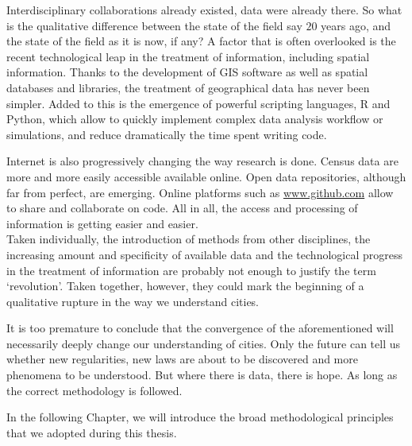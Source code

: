 Interdisciplinary collaborations already existed, data were already there. So
what is the qualitative difference between the state of the field say $20$ years
ago, and the state of the field as it is now, if any? A factor that is often
overlooked is the recent technological leap in the treatment of information,
including spatial information. Thanks to the development of GIS software as well
as spatial databases and libraries, the treatment of geographical data has never
been simpler. Added to this is the emergence of powerful scripting languages, R
and Python, which allow to quickly implement complex data analysis workflow or
simulations, and reduce dramatically the time spent writing code. 

Internet is also progressively changing the way research is done. Census data
are more and more easily accessible available online. Open data repositories,
although far from perfect, are emerging. Online platforms such as
\url{www.github.com} allow to share and collaborate on code. All in all,
the access and processing of information is getting easier and easier.\\


Taken individually, the introduction of methods from other disciplines, the
increasing amount and specificity of available data and the technological
progress in the treatment of information are probably not enough to justify
the term `revolution'. Taken together, however, they could mark the beginning of
a qualitative rupture in the way we understand cities.

It is too premature to conclude that the convergence of the aforementioned will
necessarily deeply change our understanding of cities. Only the future can tell
us whether new regularities, new laws are about to be discovered and more
phenomena to be understood. But where there is data, there is hope.
As long as the correct methodology is followed. 

In the following Chapter, we will introduce the broad methodological principles
that we adopted during this thesis.
